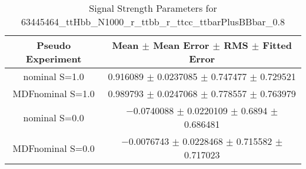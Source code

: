 \begin{table}
\centering
\caption{Signal Strength Parameters for 63445464\_ttHbb\_N1000\_r\_ttbb\_r\_ttcc\_ttbarPlusBBbar\_0.8}
\begin{tabular}{cc}
\toprule
Pseudo Experiment & Mean $\pm$ Mean Error $\pm$ RMS $\pm$ Fitted Error\\
\midrule
nominal S=1.0 & \num{0.916089} $\pm$ \num{0.0237085} $\pm$ \num{0.747477} $\pm$ \num{0.729521}\\
MDFnominal S=1.0 & \num{0.989793} $\pm$ \num{0.0247068} $\pm$ \num{0.778557} $\pm$ \num{0.763979}\\
nominal S=0.0 & \num{-0.0740088} $\pm$ \num{0.0220109} $\pm$ \num{0.6894} $\pm$ \num{0.686481}\\
MDFnominal S=0.0 & \num{-0.0076743} $\pm$ \num{0.0228468} $\pm$ \num{0.715582} $\pm$ \num{0.717023}\\
\bottomrule
\end{tabular}
\end{table}